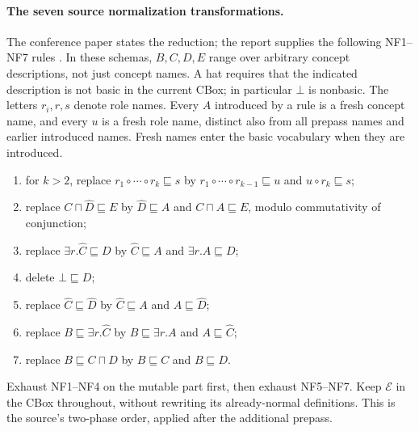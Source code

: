 \paragraph{The seven source normalization transformations.}
The conference paper states the reduction; the report supplies the following
NF1--NF7 rules
\cite[lem.~1]{BaaderBrandtLutz2005}
\cite[fig.~1 and \S3.1]{BaaderBrandtLutz2005TR}.
In these schemas, \(B,C,D,E\) range over arbitrary concept descriptions,
not just concept names.  A hat requires that the indicated description
is not basic in the current CBox; in particular \(\bot\) is nonbasic.
The letters \(r_i,r,s\) denote role names.
Every \(A\) introduced by a rule is a fresh concept name, and every \(u\)
is a fresh role name, distinct also from all prepass names and earlier
introduced names.  Fresh names enter the basic vocabulary when they are
introduced.
\begin{enumerate}
\item[(NF1)] for \(k>2\), replace
\(r_1\circ\cdots\circ r_k\sqsubseteq s\) by
\(r_1\circ\cdots\circ r_{k-1}\sqsubseteq u\) and
\(u\circ r_k\sqsubseteq s\);
\item[(NF2)] replace \(C\sqcap\widehat D\sqsubseteq E\) by
\(\widehat D\sqsubseteq A\) and \(C\sqcap A\sqsubseteq E\), modulo
commutativity of conjunction;
\item[(NF3)] replace \(\exists r.\widehat C\sqsubseteq D\) by
\(\widehat C\sqsubseteq A\) and \(\exists r.A\sqsubseteq D\);
\item[(NF4)] delete \(\bot\sqsubseteq D\);
\item[(NF5)] replace \(\widehat C\sqsubseteq\widehat D\) by
\(\widehat C\sqsubseteq A\) and \(A\sqsubseteq\widehat D\);
\item[(NF6)] replace \(B\sqsubseteq\exists r.\widehat C\) by
\(B\sqsubseteq\exists r.A\) and \(A\sqsubseteq\widehat C\);
\item[(NF7)] replace \(B\sqsubseteq C\sqcap D\) by
\(B\sqsubseteq C\) and \(B\sqsubseteq D\).
\end{enumerate}
Exhaust NF1--NF4 on the mutable part first, then exhaust NF5--NF7.
Keep \(\mathcal E\) in the CBox throughout, without rewriting its
already-normal definitions.  This is the source's two-phase order,
applied after the additional prepass.

